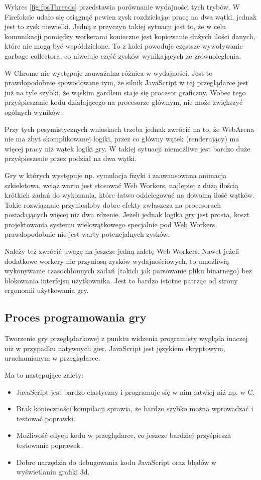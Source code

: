 Wykres \ref{fig:fpsThreads} przedstawia porównanie wydajności tych trybów. W Firefoksie udało się osiągnąć
pewien zysk rozdzielając pracę na dwa wątki, jednak jest to zysk niewielki. Jedną z przyczyn takiej sytuacji
jest to, że w celu komunikacji pomiędzy workerami konieczne jest kopiowanie dużych ilości danych, które nie mogą
być współdzielone. To z kolei powoduje częstsze wywoływanie garbage collectora, co niweluje część
zysków wynikających ze zrównoleglenia.

W Chrome nie występuje zauważalna różnica w wydajności. Jest to prawdopodobnie spowodowane tym, że silnik
JavaScript w tej przeglądarce jest już na tyle szybki, że wąskim gardłem staje się procesor graficzny.
Wobec tego przyśpieszanie kodu działającego na procesorze głównym, nie może zwiększyć ogólnych wyników.

Przy tych pesymistycznych wnioskach trzeba jednak zwrócić na to, że WebArena nie ma zbyt skomplikowanej
logiki, przez co główny wątek (renderujący) ma więcej pracy niż wątek logiki gry. W takiej sytuacji
niemożliwe jest bardzo duże przyśpieszenie przez podział na dwa wątki.

Gry w których występuje np. symulacja fizyki i zaawansowana animacja szkieletowa, wciąż warto jest
stosować Web Workers, najlepiej z dużą ilością krótkich zadań do wykonania, które łatwo oddelegować
na dowolną ilość wątków. Takie rozwiązanie przyniosłoby dobre efekty zwłaszcza na procesorach posiadających
więcej niż dwa rdzenie. Jeżeli jednak logika gry jest prosta, koszt projektowania
systemu wielowątkowego specjalnie pod Web Workers, prawdopodobnie nie jest warty potencjalnych zysków.

Należy też zwrócić uwagę na jeszcze jedną zaletę Web Workers. Nawet jeżeli dodatkowe workery nie przyniosą
zysków wydajnościowych, to umożliwią wykonywanie czasochłonnych zadań (takich jak parsowanie pliku
binarnego) bez blokowania interfejsu użytkownika. Jest to bardzo istotne patrząc od strony ergonomii
użytkowania gry.

\subsection{Proces programowania gry}

Tworzenie gry przeglądarkowej z punktu widzenia programisty wygląda inaczej niż w przypadku natywnych
gier. JavaScript jest językiem skryptowym, uruchamianym w przeglądarce.

Ma to następujące zalety:
\begin{itemize}
\item JavaScript jest bardzo elastyczny i programuje się w nim łatwiej niż np. w C.
\item Brak konieczności kompilacji sprawia, że bardzo szybko można wprowadzać i testować
  poprawki.
\item Możliwość edycji kodu w przeglądarce, co jeszcze bardziej przyśpiesza testowanie
  poprawek.
\item Dobre narzędzia do debugowania kodu JavaScript oraz błędów w wyświetlaniu grafiki 3d.
\end{itemize}

